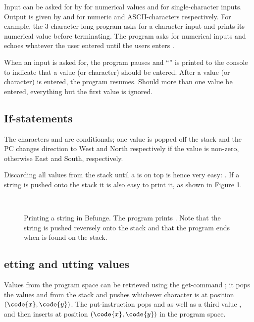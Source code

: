 \documentclass[12pt, a4paper]{article}
\begin{document}
Input can be asked for by \code{\&} for numerical values and \code{\~} for single-character inputs. Output is given by  and \code{,} for numeric and ASCII-characters respectively. For example, the 3 character long program  asks for a character input and prints its numerical value before terminating. The program  asks for numerical inputs and echoes whatever the user entered until the users enters .

When an input is asked for, the program pauses and “\code{>{}>}” is printed to the console to indicate that a value (or character) should be entered. After a value (or character) is entered, the program resumes. Should more than one value be entered, everything but the first value is ignored.

\subsection{If-statements}
\label{sec:ifs}

The characters \code{\_} and \code{|} are conditionals; one value is popped off the stack and the PC changes direction to West and North respectively if the value is non-zero, otherwise East and South, respectively.

Discarding all values from the stack until a  is on top is hence very easy: . If a string is pushed onto the stack it is also easy to print it, as shown in Figure \ref{fig:print}.

\begin{figure}[!ht]
\centering
{}\\
\code{\hspace{3.5em}\^{} ,<}
\caption{Printing a string in Befunge. The program prints . Note that the string is pushed reversely onto the stack and that the program ends when  is found on the stack.}
\label{fig:print}
\end{figure}

\subsection{etting and utting values}
\label{sec:pandg}

Values from the program space can be retrieved using the get-command ; it pops the values  and  from the stack and pushes whichever character is at position $(\code{x}, \code{y})$. The put-instruction  pops  and  as well as a third value , and then inserts  at position $(\code{x}, \code{y})$ in the program space.
\end{document}
